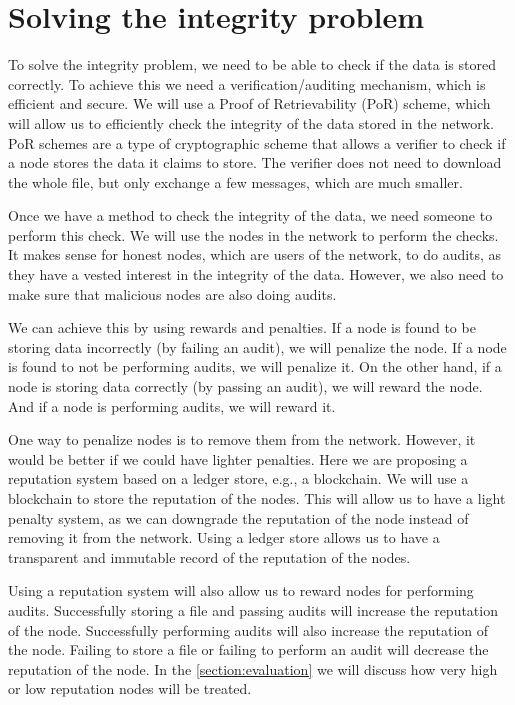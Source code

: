 \section{Solving the integrity problem}
\label{section:solving-the-integrity-problem}

To solve the integrity problem, we need to be able to check if the data is stored correctly.
To achieve this we need a verification/auditing mechanism, which is efficient and secure.
We will use a Proof of Retrievability (PoR) scheme, which will allow us to efficiently check the 
integrity of the data stored in the network.
PoR schemes are a type of cryptographic scheme that allows a verifier to check if a node
stores the data it claims to store.
The verifier does not need to download the whole file, but only exchange a few messages, which are much smaller.

Once we have a method to check the integrity of the data, we need someone to perform this check.
We will use the nodes in the network to perform the checks.
It makes sense for honest nodes, which are users of the network, to do audits,
as they have a vested interest in the integrity of the data.
However, we also need to make sure that malicious nodes are also doing audits.

We can achieve this by using rewards and penalties.
If a node is found to be storing data incorrectly (by failing an audit), we will penalize the node.
If a node is found to not be performing audits, we will penalize it.
On the other hand, if a node is storing data correctly (by passing an audit), we will reward the node.
And if a node is performing audits, we will reward it.

One way to penalize nodes is to remove them from the network.
However, it would be better if we could have lighter penalties.
Here we are proposing a reputation system based on a ledger store, e.g., a blockchain.
We will use a blockchain to store the reputation of the nodes.
This will allow us to have a light penalty system, as we can downgrade the reputation of the node
instead of removing it from the network.
Using a ledger store allows us to have a transparent and immutable record of the reputation of the nodes.

Using a reputation system will also allow us to reward nodes for performing audits.
Successfully storing a file and passing audits will increase the reputation of the node.
Successfully performing audits will also increase the reputation of the node.
Failing to store a file or failing to perform an audit will decrease the reputation of the node.
In the \ref{section:evaluation} we will discuss how very high or low reputation nodes will be treated.

